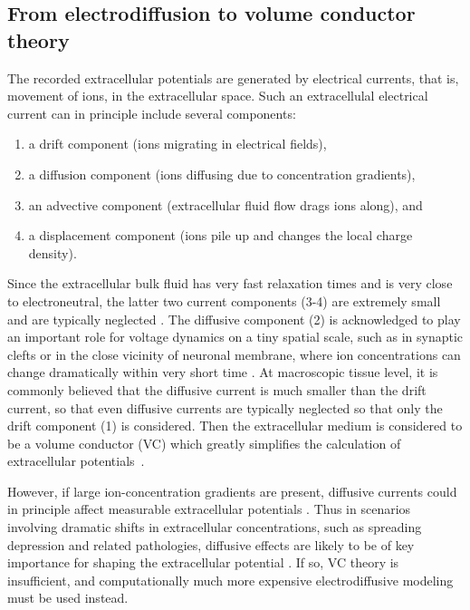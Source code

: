 \documentclass[preprint,11pt,authoryear]{elsarticle}
\newcommand{\gex}[1]{{\color{red}#1}}
\begin{document}
\begin{itemize}
\begin{itemize}
\section{%
From electrodiffusion to volume conductor theory}
\label{sec:theory}

\gex{
The recorded extracellular potentials are generated by electrical currents, that is, movement of ions, in the extracellular space.
Such an extracellulal electrical current can in principle include several components:
%
\begin{enumerate}
\item a drift component (ions migrating in electrical fields), 
\item a diffusion component (ions diffusing due to concentration gradients),
\item an advective component (extracellular fluid flow drags ions along), and
\item a displacement component (ions pile up and changes the local charge density). 
\end{enumerate}
%
Since the extracellular bulk fluid has very fast relaxation times and is very close to electroneutral, the latter two current components (3-4) are extremely small and are typically neglected \citep{Grodzinsky2011, Gratiy2017}. The diffusive component (2) is acknowledged to play an important role for voltage dynamics on a tiny spatial scale, such as in synaptic clefts or in the close vicinity of neuronal membrane, where ion concentrations can change dramatically within very short time \citep{Savtchenko2017, Pods2017}. At macroscopic tissue level, it is commonly believed that the diffusive current is much smaller than the drift current, so that even diffusive currents are typically neglected so that only the drift component (1) is considered. Then the extracellular medium is considered to be a volume conductor (VC) which greatly simplifies the calculation of extracellular potentials~\citep{Holt1999, Linden2014}.

However, if large ion-concentration gradients are present, diffusive currents could in principle affect measurable extracellular potentials \citep{Halnes2016, Halnes2017, Solbra2018}. Thus in scenarios involving dramatic shifts in extracellular concentrations, such as spreading depression and related pathologies, diffusive effects are likely to be of key importance for shaping the extracellular potential \citep{Almeida2004, OConnell2016}. If so, VC theory is insufficient, and computationally much more expensive electrodiffusive modeling must be used instead.

}
\end{itemize}
\end{itemize}
\end{document}
